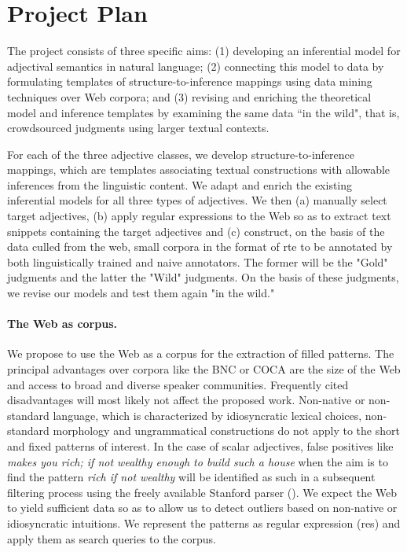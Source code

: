 \documentclass[10pt]{article}
\begin{document}
\section{Project Plan}



The project consists of three specific aims: (1) developing an inferential model for adjectival semantics in natural language; (2) connecting this model to data by formulating templates of structure-to-inference mappings using data mining techniques over Web corpora; and (3)
revising and enriching the  theoretical model and inference templates by examining the same data ``in the wild", that is,  crowdsourced judgments using larger textual contexts. 

For each of the three adjective classes, we develop structure-to-inference mappings, which are templates associating textual constructions with allowable inferences from the linguistic content. We adapt and enrich the existing inferential models for all three types of adjectives. We then (a) manually select target adjectives, (b) apply regular expressions to the Web so as to extract 
text snippets containing the target adjectives and (c) construct, on the basis of the data culled from the web, small corpora in the format of {\sc rte} 
to be annotated by both linguistically trained and naive annotators. The former will be the "Gold" judgments and the latter the "Wild" judgments. On the basis of these judgments, we revise our models and test them again "in the wild." 

\paragraph{The Web as corpus.}
We propose to use the Web as a corpus for the extraction of filled patterns. 
The principal advantages over corpora like the BNC or COCA  are the size of the Web and access to broad and diverse speaker communities. 
Frequently cited disadvantages will most likely not affect the proposed work. Non-native or non-standard language, which is characterized by idiosyncratic lexical choices, 
non-standard morphology and ungrammatical constructions do not apply to the short and fixed patterns of interest. In the case of scalar adjectives, false positives 
like \textit{makes you rich; if not wealthy enough to build such a house} when the aim is to find the pattern \emph{rich if not wealthy} will be identified as such in 
a subsequent filtering process using the freely available Stanford parser (\cite{marneffe+maccartney+manning:2006}).
We expect the Web to yield sufficient data so as to allow us to detect outliers based on non-native or idiosyncratic intuitions. We represent the patterns as regular expression ({\sc re}s) and apply them as search queries to the corpus. 
\end{document}

